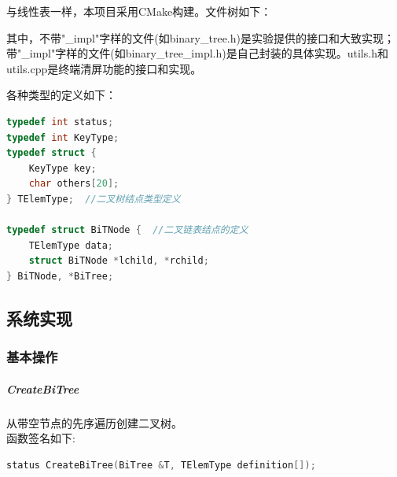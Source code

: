 \documentclass[supercite]{Experimental_Report}
\theoremstyle{definition}
\begin{document}
与线性表一样，本项目采用CMake构建。文件树如下：

其中，不带"\_impl"字样的文件(如binary\_tree.h)是实验提供的接口和大致实现；带"\_impl"字样的文件(如binary\_tree\_impl.h)是自己封装的具体实现。utils.h和utils.cpp是终端清屏功能的接口和实现。

各种类型的定义如下：
\begin{lstlisting}[language=C++, frame=single]
typedef int status;
typedef int KeyType;
typedef struct {
	KeyType key;
	char others[20];
} TElemType;  //二叉树结点类型定义

typedef struct BiTNode {  //二叉链表结点的定义
	TElemType data;
	struct BiTNode *lchild, *rchild;
} BiTNode, *BiTree;
\end{lstlisting}

\subsection{系统实现}

\subsubsection{基本操作}

\subparagraph{CreateBiTree}
\noindent
从带空节点的先序遍历创建二叉树。\\
函数签名如下:
\begin{lstlisting}[language=C++, frame=single]
status CreateBiTree(BiTree &T, TElemType definition[]);
\end{lstlisting}
\end{document}
